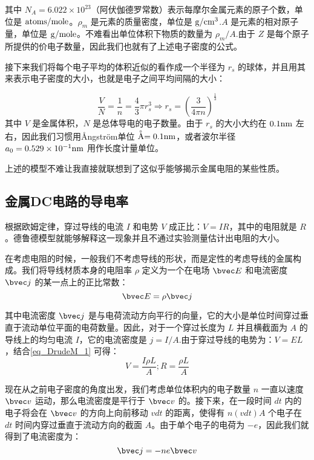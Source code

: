 其中 $N_A=6.022\times 10^{23}$（阿伏伽德罗常数）表示每摩尔金属元素的原子个数，单位是 $\rm{atoms/mole}$。$\rho_m$ 是元素的质量密度，单位是 $\rm{g/cm^3}$.$A$ 是元素的相对原子量，单位是 $\rm{g/mole}$。不难看出单位体积下物质的数量为 $\rho_m/A$.由于 $Z$ 是每个原子所提供的价电子数量，因此我们也就有了上述电子密度的公式。

接下来我们将每个电子平均的体积近似的看作成一个半径为 $r_s$ 的球体，并且用其来表示电子密度的大小，也就是电子之间平均间隔的大小：

\begin{equation}
\frac{V}{N}=\frac{1}{n}=\frac{4}{3}\pi r_s^3 \Rightarrow r_s=\left(\frac{3}{4\pi n}\right)^\frac{1}{3}
\end{equation}
其中 $V$ 是金属体积，$N$ 是总体导电的电子数量。由于 $r_s$ 的大小大约在 $0.1\rm{nm}$ 左右，因此我们习惯用Ångström单位 $\buildrel _{\circ} \over {\mathrm{A}}=0.1\rm{nm}$，或者波尔半径 $a_0=0.529\times 10^{-1}\rm{nm}$ 用作长度计量单位。

上述的模型不难让我直接就联想到了这似乎能够揭示金属电阻的某些性质。

\subsection{金属DC电路的导电率}

根据欧姆定律，穿过导线的电流 $I$ 和电势 $V$ 成正比：$V=IR$，其中的电阻就是 $R$。德鲁德模型就能够解释这一现象并且不通过实验测量估计出电阻的大小。

在考虑电阻的时候，一般我们不考虑导线的形状，而是定性的考虑导线的金属构成。我们将导线材质本身的电阻率 $\rho$ 定义为一个在电场 $\bvec E$ 和电流密度 $\bvec j$ 的某一点上的正比常数：
\begin{equation}\label{eq_DrudeM_1}
\bvec E =\rho \bvec j
\end{equation}

其中电流密度 $\bvec j$ 是与电荷流动方向平行的向量，它的大小是单位时间穿过垂直于流动单位平面的电荷数量。因此，对于一个穿过长度为 $L$ 并且横截面为 $A$ 的导线上的均匀电流 $I$，它的电流密度是 $j=I/A$.由于穿过导线的电势为：$V=EL$，结合\autoref{eq_DrudeM_1} 可得：
\begin{equation}
V=\frac{I\rho L}{A}; R = \frac{\rho L}{A}
\end{equation}

现在从之前电子密度的角度出发，我们考虑单位体积内的电子数量 $n$ 一直以速度 $\bvec v$ 运动，那么电流密度是平行于 $\bvec v$ 的。接下来，在一段时间 $dt$ 内的电子将会在 $\bvec v$ 的方向上向前移动 $v dt$ 的距离，使得有 $n(v dt)A$ 个电子在 $dt$ 时间内穿过垂直于流动方向的截面 $A$。由于单个电子的电荷为 $-e$，因此我们就得到了电流密度为：
\begin{equation}\label{eq_DrudeM_2}
\bvec j = -ne\bvec v
\end{equation}

